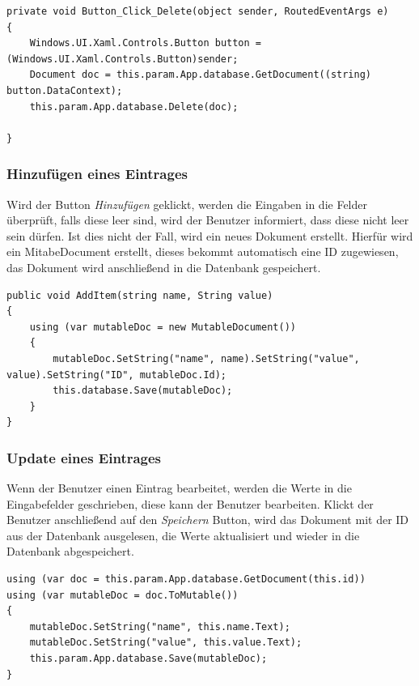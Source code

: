 \begin{verbatim}
private void Button_Click_Delete(object sender, RoutedEventArgs e)
{
	Windows.UI.Xaml.Controls.Button button = (Windows.UI.Xaml.Controls.Button)sender;
	Document doc = this.param.App.database.GetDocument((string) button.DataContext);
	this.param.App.database.Delete(doc);
	
}
\end{verbatim}

\subsubsection{Hinzufügen eines Eintrages}

Wird der Button \textit{Hinzufügen} geklickt, werden die Eingaben in die Felder überprüft, falls diese leer sind, wird der Benutzer informiert, dass diese nicht leer sein dürfen. Ist dies nicht der Fall, wird ein neues Dokument erstellt. Hierfür wird ein MitabeDocument erstellt, dieses bekommt automatisch eine ID zugewiesen, das Dokument wird anschließend in die Datenbank gespeichert. \cite{couchbasegettingstarted}

\begin{verbatim}
public void AddItem(string name, String value)
{
	using (var mutableDoc = new MutableDocument())
	{
		mutableDoc.SetString("name", name).SetString("value", value).SetString("ID", mutableDoc.Id);
		this.database.Save(mutableDoc);
	}
}
\end{verbatim}

\subsubsection{Update eines Eintrages}

Wenn der Benutzer einen Eintrag bearbeitet, werden die Werte in die Eingabefelder geschrieben, diese kann der Benutzer bearbeiten. Klickt der Benutzer anschließend auf den \textit{Speichern} Button, wird das Dokument mit der ID aus der Datenbank ausgelesen, die Werte aktualisiert und wieder in die Datenbank abgespeichert. \cite{couchbasegettingstarted}

\begin{verbatim}
using (var doc = this.param.App.database.GetDocument(this.id))
using (var mutableDoc = doc.ToMutable())
{
	mutableDoc.SetString("name", this.name.Text);
	mutableDoc.SetString("value", this.value.Text);
	this.param.App.database.Save(mutableDoc);
}
\end{verbatim}